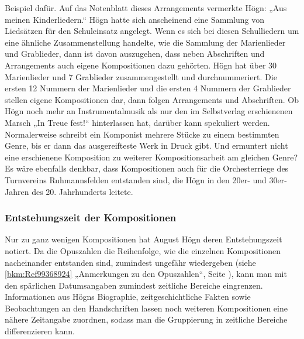 \documentclass[a4paper]{article}
\begin{document}
Beispiel dafür. Auf das Notenblatt dieses Arrangements vermerkte Högn:
„Aus meinen Kinderliedern.“ Högn hatte sich anscheinend eine Sammlung
von Liedsätzen für den Schuleinsatz angelegt. Wenn es sich bei diesen
Schulliedern um eine ähnliche Zusammenstellung handelte, wie die
Sammlung der Marienlieder und Grablieder, dann ist davon auszugehen,
dass neben Abschriften und Arrangements auch eigene Kompositionen dazu
gehörten. Högn hat über 30 Marienlieder und 7 Grablieder
zusammengestellt und durchnummeriert. Die ersten 12 Nummern der
Marienlieder und die ersten 4 Nummern der Grablieder stellen eigene
Kompositionen dar, dann folgen Arrangements und Abschriften. Ob Högn
noch mehr an Instrumentalmusik als nur den im Selbstverlag erschienenen
Marsch „In Treue fest!“ hinterlassen hat, darüber kann spekuliert
werden. Normalerweise schreibt ein Komponist mehrere Stücke zu einem
bestimmten Genre, bis er dann das ausgereifteste Werk in Druck gibt.
Und ermuntert nicht eine erschienene Komposition zu weiterer
Kompositionsarbeit am gleichen Genre? Es wäre ebenfalls denkbar, dass
Kompositionen auch für die Orchesterriege des Turnvereins
Ruhmannsfelden entstanden sind, die Högn in den 20er- und 30er-Jahren
des 20. Jahrhunderts leitete.

\subsubsection{Entstehungszeit der Kompositionen}
\label{bkm:Ref98427747}\hypertarget{RefHeadingToc100333742}{}Nur zu ganz
wenigen Kompositionen hat August Högn deren Entstehungszeit notiert. Da
die Opuszahlen die Reihenfolge, wie die einzelnen Kompositionen
nacheinander entstanden sind, zumindest ungefähr wiedergeben (siehe
\ref{bkm:Ref99368924} „Anmerkungen zu den Opuszahlen“, Seite
\pageref{bkm:Ref98509933}), kann man mit den spärlichen Datumsangaben
zumindest zeitliche Bereiche eingrenzen. Informationen aus Högns
Biographie, zeitgeschichtliche Fakten sowie Beobachtungen an den
Handschriften lassen noch weiteren Kompositionen eine nähere Zeitangabe
zuordnen, sodass man die Gruppierung in zeitliche Bereiche
differenzieren kann.
\end{document}
